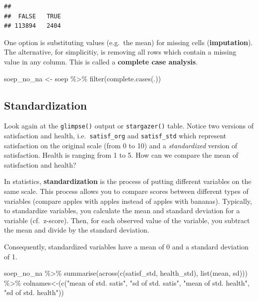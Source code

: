 \documentclass[
]{book}
\newenvironment{Shaded}{\begin{snugshade}}{\end{snugshade}}
\newcommand{\AttributeTok}[1]{\textcolor[rgb]{0.77,0.63,0.00}{#1}}
\newcommand{\FunctionTok}[1]{\textcolor[rgb]{0.00,0.00,0.00}{#1}}
\newcommand{\NormalTok}[1]{#1}
\newcommand{\OtherTok}[1]{\textcolor[rgb]{0.56,0.35,0.01}{#1}}
\newcommand{\SpecialCharTok}[1]{\textcolor[rgb]{0.00,0.00,0.00}{#1}}
\newcommand{\StringTok}[1]{\textcolor[rgb]{0.31,0.60,0.02}{#1}}
\begin{document}
\begin{verbatim}
## 
##  FALSE   TRUE 
## 113894   2404
\end{verbatim}

One option is substituting values (e.g.~the mean) for missing cells (\textbf{imputation}). The alternative, for simplicitiy, is removing all rows which contain a missing value in any column. This is called a \textbf{complete case analysis}.

\begin{Shaded}
\begin{Highlighting}[]
\NormalTok{soep\_no\_na }\OtherTok{\textless{}{-}}\NormalTok{ soep }\SpecialCharTok{\%\textgreater{}\%} \FunctionTok{filter}\NormalTok{(}\FunctionTok{complete.cases}\NormalTok{(.))}
\end{Highlighting}
\end{Shaded}

\hypertarget{standardization}{%
\subsection{Standardization}\label{standardization}}

Look again at the \texttt{glimpse()} output or \texttt{stargazer()} table. Notice two versions of satisfaction and health, i.e.~\texttt{satisf\_org} and \texttt{satisf\_std} which represent satisfaction on the original scale (from 0 to 10) and a \emph{standardized} version of satisfaction. Health is ranging from 1 to 5. How can we compare the mean of satisfaction and health?

In statistics, \textbf{standardization} is the process of putting different variables on the same scale. This process allows you to compare scores between different types of variables (compare apples with apples instead of apples with bananas). Typically, to standardize variables, you calculate the mean and standard deviation for a variable (cf.~z-score). Then, for each observed value of the variable, you subtract the mean and divide by the standard deviation.

Consequently, standardized variables have a mean of 0 and a standard deviation of 1.

\begin{Shaded}
\begin{Highlighting}[]
\NormalTok{soep\_no\_na }\SpecialCharTok{\%\textgreater{}\%}
  \FunctionTok{summarise}\NormalTok{(}\FunctionTok{across}\NormalTok{(}\FunctionTok{c}\NormalTok{(satisf\_std, health\_std), }\FunctionTok{list}\NormalTok{(mean, sd))) }\SpecialCharTok{\%\textgreater{}\%}
  \StringTok{\textasciigrave{}}\AttributeTok{colnames\textless{}{-}}\StringTok{\textasciigrave{}}\NormalTok{(}\FunctionTok{c}\NormalTok{(}\StringTok{"mean of std. satis"}\NormalTok{, }\StringTok{"sd of std. satis"}\NormalTok{, }
                 \StringTok{"mean of std. health"}\NormalTok{, }\StringTok{"sd of std. health"}\NormalTok{))}
\end{Highlighting}
\end{Shaded}
\end{document}
